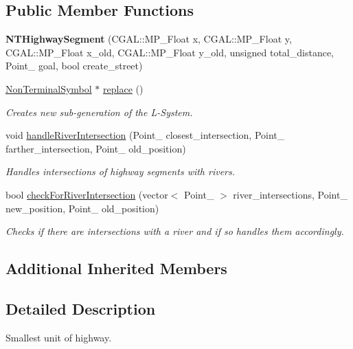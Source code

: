 \subsection*{Public Member Functions}
\begin{DoxyCompactItemize}
\item 
\hypertarget{class_n_t_highway_segment_adca391b80753f8fe54ab86657b9a49b6}{}\label{class_n_t_highway_segment_adca391b80753f8fe54ab86657b9a49b6} 
{\bfseries N\+T\+Highway\+Segment} (C\+G\+A\+L\+::\+M\+P\+\_\+\+Float x, C\+G\+A\+L\+::\+M\+P\+\_\+\+Float y, C\+G\+A\+L\+::\+M\+P\+\_\+\+Float x\+\_\+old, C\+G\+A\+L\+::\+M\+P\+\_\+\+Float y\+\_\+old, unsigned total\+\_\+distance, Point\+\_ goal, bool create\+\_\+street)
\item 
\hyperlink{class_non_terminal_symbol}{Non\+Terminal\+Symbol} $\ast$ \hyperlink{class_n_t_highway_segment_a22518e50d87a70aeb1ead58b26dfa483}{replace} ()
\begin{DoxyCompactList}\small\item\em Creates new sub-\/generation of the L-\/\+System. \end{DoxyCompactList}\item 
void \hyperlink{class_n_t_highway_segment_a0008e99793162c8d78903aa9d35518df}{handle\+River\+Intersection} (Point\+\_ closest\+\_\+intersection, Point\+\_ farther\+\_\+intersection, Point\+\_ old\+\_\+position)
\begin{DoxyCompactList}\small\item\em Handles intersections of highway segments with rivers. \end{DoxyCompactList}\item 
bool \hyperlink{class_n_t_highway_segment_adad0b1eecee26cfb43a6f53bbf560a1c}{check\+For\+River\+Intersection} (vector$<$ Point\+\_ $>$ river\+\_\+intersections, Point\+\_ new\+\_\+position, Point\+\_ old\+\_\+position)
\begin{DoxyCompactList}\small\item\em Checks if there are intersections with a river and if so handles them accordingly. \end{DoxyCompactList}\end{DoxyCompactItemize}
\subsection*{Additional Inherited Members}


\subsection{Detailed Description}
Smallest unit of highway. 

